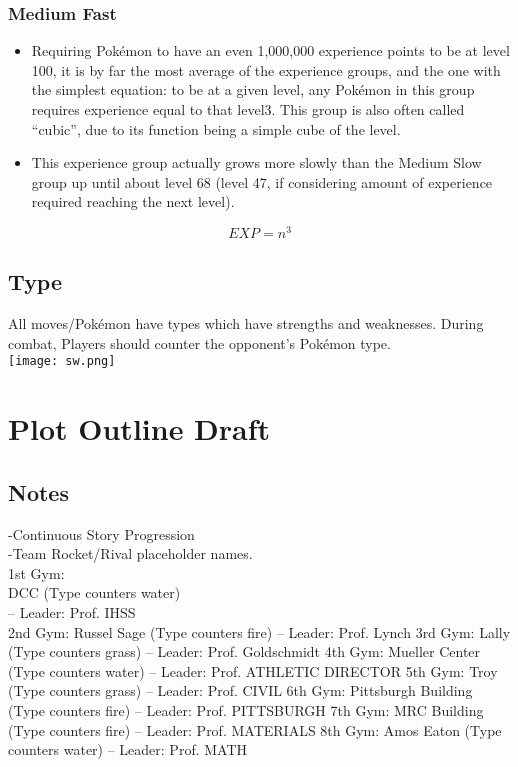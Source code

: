 \documentclass[11pt,fleqn]{book} %
\begin{document}
\subsection{Medium Fast}
\begin{itemize}
	\item Requiring Pokémon to have an even 1,000,000 experience points to be at level 100, it is by far the most average of the experience groups, and the one with the simplest equation: to be at a given level, any Pokémon in this group requires experience equal to that level3. This group is also often called “cubic”, due to its function being a simple cube of the level.
	\item This experience group actually grows more slowly than the Medium Slow group up until about level 68 (level 47, if considering amount of experience required reaching the next level).
\end{itemize}
$$EXP = n^3$$
\newpage
\section{Type}
All moves/Pokémon have types which have strengths and weaknesses. During combat, Players should counter the opponent’s Pokémon type.\\
\texttt{[image: sw.png]}

\newpage


\chapter{Plot Outline Draft}
\section{Notes}
-Continuous Story Progression\\
-Team Rocket/Rival placeholder names.\\
1st Gym: \\
\indent DCC (Type counters water) \\
\indent – Leader: Prof. IHSS\\
2nd Gym:
Russel Sage (Type counters fire)
– Leader: Prof. Lynch
3rd Gym: 
Lally (Type counters grass) 
– Leader: Prof. Goldschmidt
4th Gym:
 Mueller Center (Type counters water)
– Leader: Prof. ATHLETIC DIRECTOR
5th Gym:
 Troy (Type counters grass)
– Leader: Prof. CIVIL
6th Gym:
 Pittsburgh Building (Type counters fire)
– Leader: Prof. PITTSBURGH
7th Gym:
 MRC Building (Type counters fire)
– Leader: Prof. MATERIALS
8th Gym:
 Amos Eaton (Type counters water)
– Leader: Prof. MATH
\end{document}
